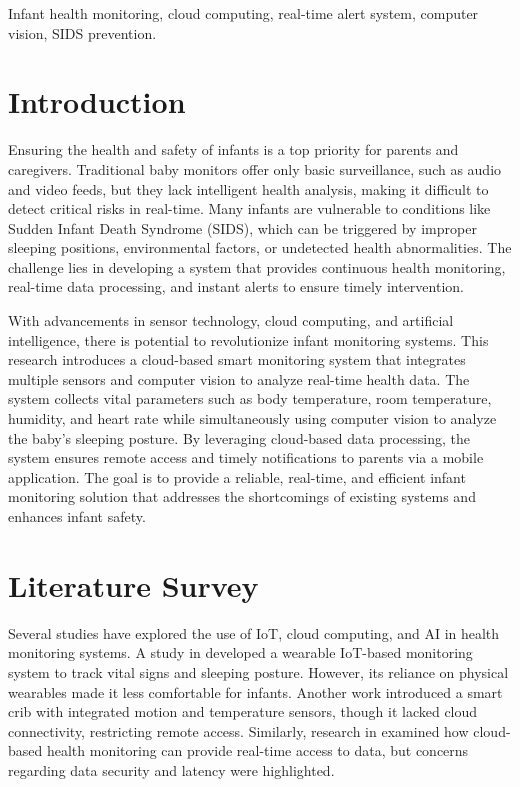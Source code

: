 \documentclass[conference]{IEEEtran}
\begin{document}
    \begin{IEEEkeywords}
    Infant health monitoring, cloud computing, real-time alert system, computer vision, SIDS prevention.
    \end{IEEEkeywords}
    
    \section{Introduction}
    Ensuring the health and safety of infants is a top priority for parents and caregivers. Traditional baby monitors offer only basic surveillance, such as audio and video feeds, but they lack intelligent health analysis, making it difficult to detect critical risks in real-time. Many infants are vulnerable to conditions like Sudden Infant Death Syndrome (SIDS), which can be triggered by improper sleeping positions, environmental factors, or undetected health abnormalities. The challenge lies in developing a system that provides continuous health monitoring, real-time data processing, and instant alerts to ensure timely intervention.

With advancements in sensor technology, cloud computing, and artificial intelligence, there is potential to revolutionize infant monitoring systems. This research introduces a cloud-based smart monitoring system that integrates multiple sensors and computer vision to analyze real-time health data. The system collects vital parameters such as body temperature, room temperature, humidity, and heart rate while simultaneously using computer vision to analyze the baby’s sleeping posture. By leveraging cloud-based data processing, the system ensures remote access and timely notifications to parents via a mobile application. The goal is to provide a reliable, real-time, and efficient infant monitoring solution that addresses the shortcomings of existing systems and enhances infant safety.
\section{Literature Survey}
Several studies have explored the use of IoT, cloud computing, and AI in health monitoring systems. A study in \cite{ref1} developed a wearable IoT-based monitoring system to track vital signs and sleeping posture. However, its reliance on physical wearables made it less comfortable for infants. Another work \cite{ref2} introduced a smart crib with integrated motion and temperature sensors, though it lacked cloud connectivity, restricting remote access. Similarly, research in \cite{ref3} examined how cloud-based health monitoring can provide real-time access to data, but concerns regarding data security and latency were highlighted.
\end{document}
